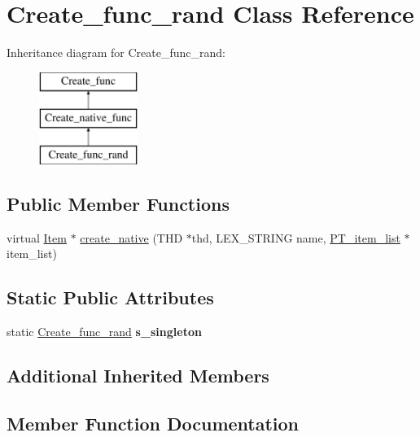 \hypertarget{classCreate__func__rand}{}\section{Create\+\_\+func\+\_\+rand Class Reference}
\label{classCreate__func__rand}
Inheritance diagram for Create\+\_\+func\+\_\+rand\+:\begin{figure}[H]
\begin{center}
\leavevmode
\includegraphics[height=3.000000cm]{classCreate__func__rand}
\end{center}
\end{figure}
\subsection*{Public Member Functions}
\begin{DoxyCompactItemize}
\item 
virtual \mbox{\hyperlink{classItem}{Item}} $\ast$ \mbox{\hyperlink{classCreate__func__rand_af2a86fc4bb43775dfae5afea2d4b9c43}{create\+\_\+native}} (T\+HD $\ast$thd, L\+E\+X\+\_\+\+S\+T\+R\+I\+NG name, \mbox{\hyperlink{classPT__item__list}{P\+T\+\_\+item\+\_\+list}} $\ast$item\+\_\+list)
\end{DoxyCompactItemize}
\subsection*{Static Public Attributes}
\begin{DoxyCompactItemize}
\item 
\mbox{\label{classCreate__func__rand_a1644b078c063e99c8bd215315ed64b79}} 
static \mbox{\hyperlink{classCreate__func__rand}{Create\+\_\+func\+\_\+rand}} {\bfseries s\+\_\+singleton}
\end{DoxyCompactItemize}
\subsection*{Additional Inherited Members}


\subsection{Member Function Documentation}
\mbox{\label{classCreate__func__rand_af2a86fc4bb43775dfae5afea2d4b9c43}} 
